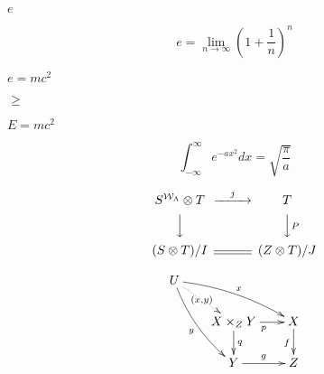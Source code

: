 \documentclass[10pt]{book}
\begin{document}
\begin{mdSnippets}
\begin{mdInlineSnippet}[e1671797c52e15f763380b45e841ec32]%
$e$\end{mdInlineSnippet}%
\begin{mdDisplaySnippet}[3237b2e9a664b881e4e2d1c3fd75b063]%
\[e = \lim_{n\to\infty} \left( 1 + \frac{1}{n} \right)^n
\]%
\end{mdDisplaySnippet}%
\begin{mdInlineSnippet}[a42da9c575b4e6bcbde63bd2e43f6ce9]%
$e = mc^2$\end{mdInlineSnippet}%
\begin{mdInlineSnippet}%
$\ge$\end{mdInlineSnippet}%
\begin{mdInlineSnippet}[281a70c20b16a38d7781189936e1ac9f]%
$E = mc^2$\end{mdInlineSnippet}%
\begin{mdDisplaySnippet}%
\[ \int_{-\infty}^\infty e^{-a x^2} d x = \sqrt{\frac{\pi}{a}} 
\]%
\end{mdDisplaySnippet}%
\begin{mdDisplaySnippet}[b08537d83682298cd52cf26af41c99da]%
\[\begin{CD}
S^{{\mathcal{W}}_\Lambda}\otimes T @>j>> T\\
@VVV @VV{P}V\\
(S\otimes T)/I @= (Z \otimes T)/J
\end{CD}
\]%
\end{mdDisplaySnippet}%
\begin{mdDisplaySnippet}%
\[\xymatrix @-0.5em{
U \ar@/_/[ddr]_y \ar@/^/[drr]^x
\ar@{.>}[dr]|-{(x,y)} \\
& X \times_Z Y \ar[d]^q \ar[r]_p
& X \ar[d]_f \\
& Y \ar[r]^g & Z } 
\]%
\end{mdDisplaySnippet}%
\newcommand{\infer}[3]{#1 \vdash #2\,:#3}


\end{mdSnippets}
\end{document}
